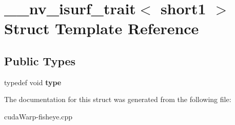 \hypertarget{struct____nv__isurf__trait_3_01short1_01_4}{}\section{\+\_\+\+\_\+nv\+\_\+isurf\+\_\+trait$<$ short1 $>$ Struct Template Reference}
\label{struct____nv__isurf__trait_3_01short1_01_4}
\subsection*{Public Types}
\begin{DoxyCompactItemize}
\item 
typedef void {\bfseries type}\hypertarget{struct____nv__isurf__trait_3_01short1_01_4_a2408219ee447aa0f517aeb5e73959fe6}{}\label{struct____nv__isurf__trait_3_01short1_01_4_a2408219ee447aa0f517aeb5e73959fe6}

\end{DoxyCompactItemize}


The documentation for this struct was generated from the following file\+:\begin{DoxyCompactItemize}
\item 
cuda\+Warp-\/fisheye.\+cpp\end{DoxyCompactItemize}
